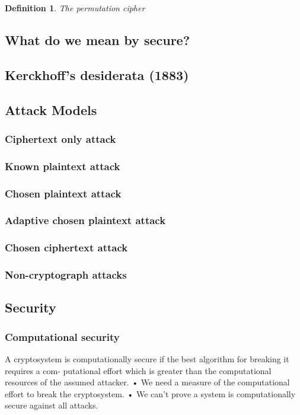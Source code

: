 \documentclass{article}
\theoremstyle{quest}
\newtheorem*{definition}{Definition}
\begin{document}
\begin{definition}
	The \textit{permutation cipher}
\end{definition}

\subsection{What do we mean by secure?}

\subsection{Kerckhoff's desiderata (1883)}

\subsection{Attack Models}
\subsubsection{Ciphertext only attack}
\subsubsection{Known plaintext attack}
\subsubsection{Chosen plaintext attack}
\subsubsection{Adaptive chosen plaintext attack}
\subsubsection{Chosen ciphertext attack}
\subsubsection{Non-cryptograph attacks}

\subsection{Security}
\subsubsection{Computational security}
A cryptosystem is computationally secure if the best algorithm for breaking it requires a com- putational effort which is greater than the computational resources of the assumed attacker.
• We need a measure of the computational effort to break the cryptosystem. • We can’t prove a system is computationally secure against all attacks.
\end{document}
